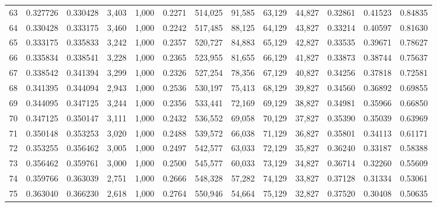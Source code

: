 \begin{tabular}{rrrrrrrrrrrrr}
63  &  0.327726 &  0.330428 &   3,403 &  1,000 &                                     0.2271 &  514,025 &   91,585 &   63,129 &   44,827 &  0.32861 &  0.41523 &  0.84835 \\
64  &  0.330428 &  0.333175 &   3,460 &  1,000 &                                     0.2242 &  517,485 &   88,125 &   64,129 &   43,827 &  0.33214 &  0.40597 &  0.81630 \\
65  &  0.333175 &  0.335833 &   3,242 &  1,000 &                                     0.2357 &  520,727 &   84,883 &   65,129 &   42,827 &  0.33535 &  0.39671 &  0.78627 \\
66  &  0.335834 &  0.338541 &   3,228 &  1,000 &                                     0.2365 &  523,955 &   81,655 &   66,129 &   41,827 &  0.33873 &  0.38744 &  0.75637 \\
67  &  0.338542 &  0.341394 &   3,299 &  1,000 &                                     0.2326 &  527,254 &   78,356 &   67,129 &   40,827 &  0.34256 &  0.37818 &  0.72581 \\
68  &  0.341395 &  0.344094 &   2,943 &  1,000 &                                     0.2536 &  530,197 &   75,413 &   68,129 &   39,827 &  0.34560 &  0.36892 &  0.69855 \\
69  &  0.344095 &  0.347125 &   3,244 &  1,000 &                                     0.2356 &  533,441 &   72,169 &   69,129 &   38,827 &  0.34981 &  0.35966 &  0.66850 \\
70  &  0.347125 &  0.350147 &   3,111 &  1,000 &                                     0.2432 &  536,552 &   69,058 &   70,129 &   37,827 &  0.35390 &  0.35039 &  0.63969 \\
71  &  0.350148 &  0.353253 &   3,020 &  1,000 &                                     0.2488 &  539,572 &   66,038 &   71,129 &   36,827 &  0.35801 &  0.34113 &  0.61171 \\
72  &  0.353255 &  0.356462 &   3,005 &  1,000 &                                     0.2497 &  542,577 &   63,033 &   72,129 &   35,827 &  0.36240 &  0.33187 &  0.58388 \\
73  &  0.356462 &  0.359761 &   3,000 &  1,000 &                                     0.2500 &  545,577 &   60,033 &   73,129 &   34,827 &  0.36714 &  0.32260 &  0.55609 \\
74  &  0.359766 &  0.363039 &   2,751 &  1,000 &                                     0.2666 &  548,328 &   57,282 &   74,129 &   33,827 &  0.37128 &  0.31334 &  0.53061 \\
75  &  0.363040 &  0.366230 &   2,618 &  1,000 &                                     0.2764 &  550,946 &   54,664 &   75,129 &   32,827 &  0.37520 &  0.30408 &  0.50635 \\

\end{tabular}
